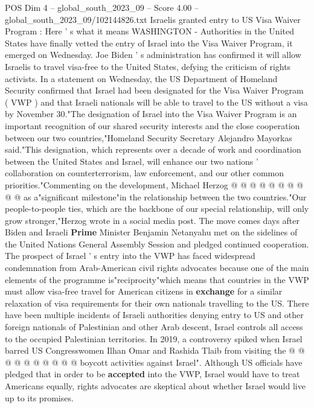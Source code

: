 \begin{textsample}{POS Dim 4 – global\_south\_2023\_09 – Score 4.00 – global\_south\_2023\_09/102144826.txt}  \label{ex:f4_pos_434}
Israelis granted entry to US Visa Waiver Program : Here ' s what it means WASHINGTON - Authorities in the United States have finally vetted the entry of Israel into the Visa Waiver Program, it emerged on Wednesday.
Joe Biden ' s administration has confirmed it will allow Israelis to travel visa-free to the United States, defying the criticism of rights activists.
In a statement on Wednesday, the US Department of Homeland Security confirmed that Israel had been designated for the Visa Waiver Program ( VWP ) and that Israeli nationals will be able to travel to the US without a visa by November 30."The designation of Israel into the Visa Waiver Program is an important recognition of our shared security interests and the close cooperation between our two countries,"Homeland Security Secretary Alejandro Mayorkas said."This designation, which represents over a decade of work and coordination between the United States and Israel, will enhance our two nations ' collaboration on counterterrorism, law enforcement, and our other common priorities."Commenting on the development, Michael Herzog @ @ @ @ @ @ @ @ @ @ as a"significant milestone"in the relationship between the two countries."Our people-to-people ties, which are the backbone of our special relationship, will only grow stronger,"Herzog wrote in a social media post.
The move comes days after Biden and Israeli \textbf{Prime} Minister Benjamin Netanyahu met on the sidelines of the United Nations General Assembly Session and pledged continued cooperation.
The prospect of Israel ' s entry into the VWP has faced widespread condemnation from Arab-American civil rights advocates because one of the main elements of the programme is"reciprocity"which means that countries in the VWP must allow visa-free travel for American citizens in \textbf{exchange} for a similar relaxation of visa requirements for their own nationals travelling to the US.
There have been multiple incidents of Israeli authorities denying entry to US and other foreign nationals of Palestinian and other Arab descent, Israel controls all access to the occupied Palestinian territories.
In 2019, a controversy spiked when Israel barred US Congresswomen Ilhan Omar and Rashida Tlaib from visiting the @ @ @ @ @ @ @ @ @ @ boycott activities against Israel".
Although US officials have pledged that in order to be \textbf{accepted} into the VWP, Israel would have to treat Americans equally, rights advocates are skeptical about whether Israel would live up to its promises.

\end{textsample}

